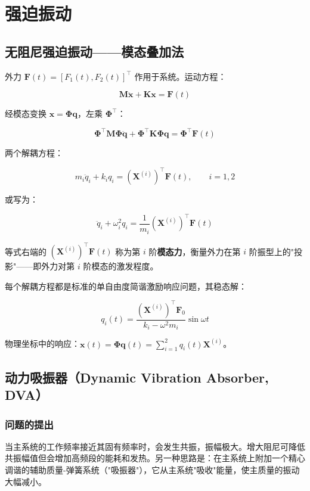 \section{强迫振动}

\subsection{无阻尼强迫振动——模态叠加法}

外力 $\mathbf{F}(t) = [F_1(t), F_2(t)]^{\top}$ 作用于系统。运动方程：

\[
\mathbf{M}\ddot{\mathbf{x}} + \mathbf{K}\mathbf{x} = \mathbf{F}(t)
\]

经模态变换 $\mathbf{x} = \mathbf{\Phi}\mathbf{q}$，左乘 $\mathbf{\Phi}^{\top}$：

\[
\mathbf{\Phi}^{\top}\mathbf{M}\mathbf{\Phi} \ddot{\mathbf{q}} + \mathbf{\Phi}^{\top}\mathbf{K}\mathbf{\Phi} \mathbf{q} = \mathbf{\Phi}^{\top}\mathbf{F}(t)
\]

两个解耦方程：

\begin{myformula}
\[
m_i \ddot{q}_i + k_i q_i = (\mathbf{X}^{(i)})^{\top} \mathbf{F}(t), \qquad i = 1, 2
\]
\end{myformula}

或写为：

\[
\ddot{q}_i + \omega_i^2 q_i = \frac{1}{m_i} (\mathbf{X}^{(i)})^{\top} \mathbf{F}(t)
\]

等式右端的 $(\mathbf{X}^{(i)})^{\top}\mathbf{F}(t)$ 称为第 $i$ 阶\textbf{模态力}，衡量外力在第 $i$ 阶振型上的"投影"——即外力对第 $i$ 阶模态的激发程度。

每个解耦方程都是标准的单自由度简谐激励响应问题，其稳态解：

\[
q_i(t) = \frac{(\mathbf{X}^{(i)})^{\top} \mathbf{F}_0}{k_i - \omega^2 m_i} \sin\omega t
\]

物理坐标中的响应：$\mathbf{x}(t) = \mathbf{\Phi}\mathbf{q}(t) = \sum_{i=1}^2 q_i(t)\mathbf{X}^{(i)}$。

\subsection{动力吸振器（Dynamic Vibration Absorber, DVA）}

\subsubsection{问题的提出}

当主系统的工作频率接近其固有频率时，会发生共振，振幅极大。增大阻尼可降低共振幅值但会增加高频段的能耗和发热。另一种思路是：在主系统上附加一个精心调谐的辅助质量-弹簧系统（"吸振器"），它从主系统"吸收"能量，使主质量的振动大幅减小。

